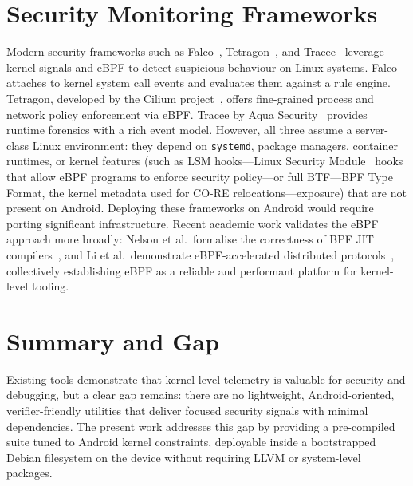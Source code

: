 \documentclass{mnitjaipur}
\begin{document}
\section{Security Monitoring Frameworks}
Modern security frameworks such as Falco~\cite{falco_doc}, Tetragon~\cite{tetragon_doc}, and Tracee~\cite{tracee_doc} leverage kernel signals and eBPF to detect suspicious behaviour on Linux systems. Falco attaches to kernel system call events and evaluates them against a rule engine. Tetragon, developed by the Cilium project~\cite{tetragon_doc}, offers fine-grained process and network policy enforcement via eBPF. Tracee by Aqua Security~\cite{tracee_doc} provides runtime forensics with a rich event model. However, all three assume a server-class Linux environment: they depend on \texttt{systemd}, package managers, container runtimes, or kernel features (such as LSM hooks---Linux Security Module~\cite{smalley2013security} hooks that allow eBPF programs to enforce security policy---or full BTF---BPF Type Format, the kernel metadata used for CO-RE relocations---exposure) that are not present on Android. Deploying these frameworks on Android would require porting significant infrastructure. Recent academic work validates the eBPF approach more broadly: Nelson et al.~formalise the correctness of BPF JIT compilers~\cite{bpf_jit_osdi2020}, and Li et al.~demonstrate eBPF-accelerated distributed protocols~\cite{electrode_nsdi2023}, collectively establishing eBPF as a reliable and performant platform for kernel-level tooling.

\section{Summary and Gap}
Existing tools demonstrate that kernel-level telemetry is valuable for security and debugging, but a clear gap remains: there are no lightweight, Android-oriented, verifier-friendly utilities that deliver focused security signals with minimal dependencies. The present work addresses this gap by providing a pre-compiled suite tuned to Android kernel constraints, deployable inside a bootstrapped Debian filesystem on the device without requiring LLVM or system-level packages.
\end{document}
